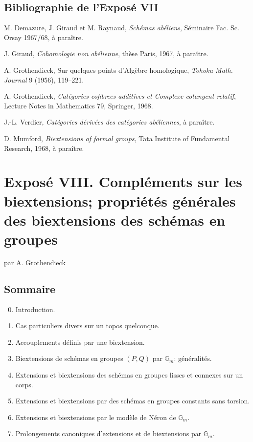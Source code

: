\documentclass[11pt]{article}
\providecommand{\Gm}{\mathbb G_m}
\begin{document}
\subsection*{Bibliographie de l'Exposé VII}
\begin{enumerate}[label={[\arabic*]}]
\item M. Demazure, J. Giraud et M. Raynaud, \emph{Schémas abéliens}, Séminaire Fac. Sc. Orsay 1967/68, à paraître.
\item J. Giraud, \emph{Cohomologie non abélienne}, thèse Paris, 1967, à paraître.
\item A. Grothendieck, Sur quelques points d'Algèbre homologique, \emph{Tohoku Math. Journal} 9 (1956), 119--221.
\item A. Grothendieck, \emph{Catégories cofibrees additives et Complexe cotangent relatif}, Lecture Notes in Mathematics 79, Springer, 1968.
\item J.-L. Verdier, \emph{Catégories dérivées des catégories abéliennes}, à paraître.
\item D. Mumford, \emph{Biextensions of formal groups}, Tata Institute of Fundamental Research, 1968, à paraître.
\end{enumerate}

\newpage
\section*{Exposé VIII. Compléments sur les biextensions; propriétés générales des biextensions des schémas en groupes}
\begin{center}
par A. Grothendieck
\end{center}

\subsection*{Sommaire}
\begin{enumerate}[label=\arabic*.]
\setcounter{enumi}{-1}
\item Introduction.
\item Cas particuliers divers sur un topos quelconque.
\item Accouplements définis par une biextension.
\item Biextensions de schémas en groupes \((P,Q)\) par \(\Gm\): généralités.
\item Extensions et biextensions des schémas en groupes lisses et connexes sur un corps.
\item Extensions et biextensions par des schémas en groupes constants sans torsion.
\item Extensions et biextensions par le modèle de Néron de \(\Gm\).
\item Prolongements canoniques d'extensions et de biextensions par \(\Gm\).
\end{enumerate}
\end{document}
